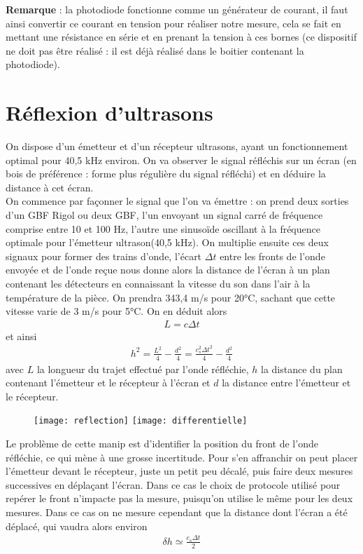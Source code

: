 \documentclass[12pt,prb,aps,epsf]{article}
\begin{document}
\textbf{Remarque} : la photodiode fonctionne comme un générateur de courant, il faut ainsi convertir ce courant en tension pour réaliser notre mesure, cela se fait en mettant une résistance en série et en prenant la tension à ces bornes (ce dispositif ne doit pas être réalisé : il est déjà réalisé dans le boitier contenant la photodiode).

\section{Réflexion d'ultrasons}
On dispose d'un émetteur et d'un récepteur ultrasons, ayant un fonctionnement optimal pour 40,5 kHz environ. On va observer le signal réfléchis sur un écran (en bois de préférence : forme plus régulière du signal réfléchi) et en déduire la distance à cet écran.\\

On commence par façonner le signal que l'on va émettre : on prend deux sorties d'un GBF Rigol ou deux GBF, l'un envoyant un signal carré de fréquence comprise entre 10 et 100 Hz, l'autre une sinusoïde oscillant à la fréquence optimale pour l'émetteur ultrason(40,5 kHz). On multiplie ensuite ces deux signaux pour former des trains d'onde, l'écart $\Delta t$ entre les fronts de l'onde envoyée et de l'onde reçue nous donne alors la distance de l'écran à un plan contenant les détecteurs en connaissant la vitesse du son dans l'air à la température de la pièce. On prendra 343,4 m/s pour 20°C, sachant que cette vitesse varie de 3 m/s pour 5°C. On en déduit alors 
\begin{eqnarray}
L = c\Delta t
\end{eqnarray}
et ainsi 
\begin{eqnarray}
h^2 = \frac{L^2}{4} - \frac{d^2}{4} = \frac{c_s^2\Delta t^2}{4} - \frac{d^2}{4} 
\end{eqnarray}
avec $L$ la longueur du trajet effectué par l'onde réfléchie, $h$ la distance du plan contenant l'émetteur et le récepteur à l'écran et $d$ la distance entre l'émetteur et le récepteur.

\begin{figure}[h]
	\centering \texttt{[image: reflection]}
				\texttt{[image: differentielle]}
\end{figure}

Le problème de cette manip est d'identifier la position du front de l'onde réfléchie, ce qui mène à une grosse incertitude. Pour s'en affranchir on peut placer l'émetteur devant le récepteur, juste un petit peu décalé, puis faire deux mesures successives en déplaçant l'écran. Dans ce cas le choix de protocole utilisé pour repérer le front n'impacte pas la mesure, puisqu'on utilise le même pour les deux mesures. Dans ce cas on ne mesure cependant que la distance dont l'écran a été déplacé, qui vaudra alors environ 
\begin{eqnarray}
\delta h \simeq \frac{c_s \Delta t}{2}
\end{eqnarray}
\end{document}
